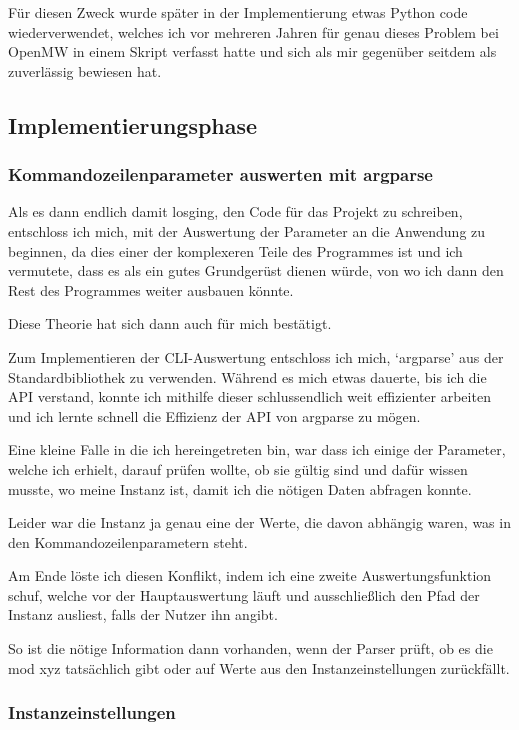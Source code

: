 \documentclass[a4paper,numbers=withenddot,11pt]{scrartcl}
\begin{document}
Für diesen Zweck wurde später in der Implementierung etwas
Python code wiederverwendet, welches ich vor mehreren Jahren
für genau dieses Problem bei OpenMW in einem Skript verfasst hatte
und sich als mir gegenüber seitdem als zuverlässig bewiesen hat.

\subsection{Implementierungsphase}
\subsubsection{Kommandozeilenparameter auswerten mit argparse}

Als es dann endlich damit losging, den Code für
das Projekt zu schreiben, entschloss ich mich, mit
der Auswertung der Parameter an die Anwendung zu beginnen,
da dies einer der komplexeren Teile des Programmes ist
und ich vermutete, dass es als ein gutes Grundgerüst dienen würde,
von wo ich dann den Rest des Programmes weiter ausbauen könnte.

Diese Theorie hat sich dann auch für mich bestätigt.

Zum Implementieren der CLI-Auswertung entschloss ich mich,
`argparse' aus der Standardbibliothek zu verwenden.
Während es mich etwas dauerte, bis ich die API verstand,
konnte ich mithilfe dieser schlussendlich weit effizienter
arbeiten und ich lernte schnell die Effizienz der API
von argparse zu mögen.

Eine kleine Falle in die ich hereingetreten bin, war dass
ich einige der Parameter, welche ich erhielt, darauf
prüfen wollte, ob sie gültig sind und dafür
wissen musste, wo meine Instanz ist, damit ich die nötigen
Daten abfragen konnte.

Leider war die Instanz ja genau eine der Werte, die
davon abhängig waren, was in den Kommandozeilenparametern steht.

Am Ende löste ich diesen Konflikt, indem ich eine zweite
Auswertungsfunktion schuf, welche vor der Hauptauswertung
läuft und ausschließlich den Pfad der Instanz ausliest, falls
der Nutzer ihn angibt.

So ist die nötige Information dann vorhanden, wenn der Parser prüft,
ob es die mod xyz tatsächlich gibt oder auf Werte aus
den Instanzeinstellungen zurückfällt.

\subsubsection{Instanzeinstellungen}
\end{document}
